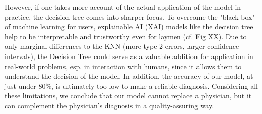 However, if one takes more account of the actual application of the model in practice, the decision tree comes into sharper focus. To overcome the "black box" of machine learning for users, explainable AI (XAI) models like the decision tree help to be interpretable and trustworthy even for laymen (cf. Fig XX). Due to only marginal differences to the KNN (more type 2 errors, larger confidence intervals), the Decision Tree could serve as a valuable addition for application in real-world problems, esp. in interaction with humans, since it allows them to understand the decision of the model. In addition, the accuracy of our model, at just under 80\%, is ultimately too low to make a reliable diagnosis. Considering all these limitations, we conclude that our model cannot replace a physician, but it can complement the physician's diagnosis in a quality-assuring way. 